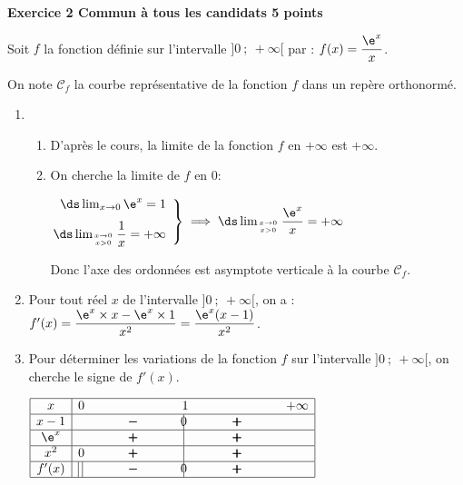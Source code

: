 \textbf{\large Exercice 2 \hfill Commun à tous les candidats \hfill 5 points}

\medskip

Soit $f$ la fonction définie sur l'intervalle $]0~;~ +\infty[$ par :
$f(x) = \dfrac{\e^x}{x}$.

On note $\mathcal{C}_f$ la courbe représentative de la fonction $f$ dans un repère orthonormé. 


\begin{enumerate}
\item 
	\begin{enumerate}
		\item D'après le cours, la limite de la fonction $f$ en $+ \infty$ est $+\infty$.
		
		\item On cherche la limite de $f$ en 0:
		
$\left.
\begin{array}{@{} r}
\ds\lim_{x\to 0} \e^{x} = 1\\[7pt]
\ds\lim_{x\to 0\atop x>0} \dfrac{1}{x}= +\infty
\end{array}
\right \rbrace
\implies
\ds\lim_{x\to 0 \atop x>0} \dfrac{\e^{x}}{x}  = +\infty$		
		
Donc l'axe des ordonnées est asymptote verticale à la courbe $\mathcal{C}_f$.
	\end{enumerate}
\item Pour tout réel $x$ de l'intervalle $]0~;~ +\infty[$, on a :
$f'(x)=\dfrac{\e^{x}\times x - \e^{x}\times 1}{x^2} = \dfrac{\e^{x} (x-1)}{x^2}$.

\item Pour déterminer les variations de la fonction $f$ sur l'intervalle $]0~;~ +\infty[$, on cherche le signe de $f'(x)$.

\begin{center}
{\renewcommand{\arraystretch}{1.5}
\def\esp{\hspace*{2cm}}
$\begin{array}{|c | *{5}{c} |} 
\hline
x  & 0 & \esp & 1 & \esp  & +\infty \\
\hline
x-1 &  & \pmb{-} &  \vline\hspace{-2.7pt}{0} & \pmb{+} &   \\
\hline
\e^{x} &  & \pmb{+} &  \vline\hspace{-2.7pt}{\phantom 0} & \pmb{+} &   \\
\hline
x^2 & 0 \hfill{} & \pmb{+} &  \vline\hspace{-2.7pt}{\phantom 0} & \pmb{+} &   \\
\hline
f'(x) &  \vline\;\vline\hfill{} & \pmb{-} &  \vline\hspace{-2.7pt}{0} & \pmb{+} &   \\
\hline
\end{array}$
}
\end{center}


\end{enumerate}

